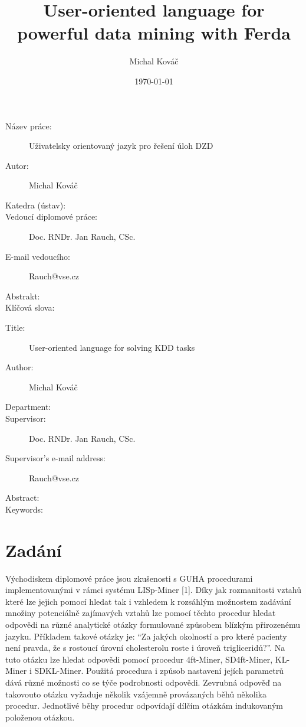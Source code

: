 \documentclass[a4paper,12pt]{book}
\author{Michal Kováč}
\title{User-oriented language for powerful data mining with Ferda}
\date{\today}
\newcommand{\uv}[1]{``#1''}
\begin{document}
\maketitle

\begin{description}
 \item [Název práce:] Uživatelsky orientovaný jazyk pro řešení úloh DZD
 \item [Autor:] Michal Kováč
 \item [Katedra (ústav):]
 \item [Vedoucí diplomové práce:] Doc. RNDr. Jan Rauch, CSc.
 \item [E-mail vedoucího:] Rauch@vse.cz
 \item [Abstrakt:]
 \item [Klíčová slova:]
\end{description}

\medskip

\begin{description}
 \item [Title:] User-oriented language for solving KDD tasks
 \item [Author:] Michal Kováč
 \item [Department:]
 \item [Supervisor:] Doc. RNDr. Jan Rauch, CSc.
 \item [Supervisor's e-mail address:] Rauch@vse.cz
 \item [Abstract:]
 \item [Keywords:]
\end{description}
\newpage

\tableofcontents

\section*{Zadání}
Východiskem diplomové práce jsou zkušenosti s GUHA procedurami implementovanými v rámci systému LISp-Miner [1]. Díky jak rozmanitosti vztahů které lze jejich pomocí hledat tak i vzhledem k rozsáhlým možnostem zadávání množiny potenciálně zajímavých vztahů lze pomocí těchto procedur hledat odpovědi na různé analytické otázky formulované způsobem blízkým přirozenému jazyku. Příkladem takové otázky je: \uv{Za jakých okolností a pro které pacienty není pravda, že s rostoucí úrovní cholesterolu roste i úroveň trigliceridů?}. Na tuto otázku lze hledat odpovědi pomocí procedur 4ft-Miner, SD4ft-Miner, KL-Miner i SDKL-Miner. Použitá procedura i způsob nastavení jejích parametrů dává různé možnosti co se týče podrobnosti odpovědi. Zevrubná odpověď na takovouto otázku vyžaduje několik vzájemně provázaných běhů několika procedur. Jednotlivé běhy procedur odpovídají dílčím otázkám indukovaným položenou otázkou.
\end{document}
